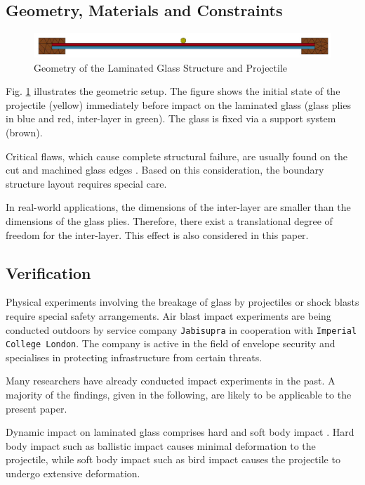 \documentclass[12pt,twoside]{article}
\theoremstyle{break}
\begin{document}
\subsection{Geometry, Materials and Constraints}

\begin{figure}[h!]
    \centering
    \includegraphics[width=\textwidth]{Geometry}
    \caption{Geometry of the Laminated Glass Structure and Projectile \cite{Che18}}
    \label{fig:geometry}
\end{figure}

Fig. \ref{fig:geometry} illustrates the geometric setup. The figure shows the initial state of the projectile (yellow) immediately before impact on the laminated glass (glass plies in blue and red, inter-layer in green). The glass is fixed via a support system (brown).

\bigbreak
Critical flaws, which cause complete structural failure, are usually found on the cut and machined glass edges \cite{Pel16}. Based on this consideration, the boundary structure layout requires special care.

\bigbreak
In real-world applications, the dimensions of the inter-layer are smaller than the dimensions of the glass plies. Therefore, there exist a translational degree of freedom for the inter-layer. This effect is also considered in this paper.

\subsection{Verification}

Physical experiments involving the breakage of glass by projectiles or shock blasts require special safety arrangements. Air blast impact experiments are being conducted outdoors by service company \texttt{Jabisupra} \cite{Jab16} in cooperation with \texttt{Imperial College London}. The company is active in the field of envelope security and specialises in protecting infrastructure from certain threats. 

\bigbreak
Many researchers have already conducted impact experiments in the past. A majority of the findings, given in the following, are likely to be applicable to the present paper.

\bigbreak
Dynamic impact on laminated glass comprises hard and soft body impact \cite{Moh17}. Hard body impact such as ballistic impact \cite{Bra10} causes minimal deformation to the projectile, while soft body impact such as bird impact \cite{Moh17} causes the projectile to undergo extensive deformation.
\end{document}
